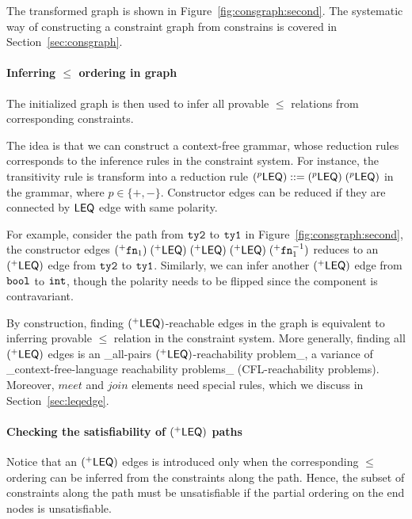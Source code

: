 The transformed graph is shown in Figure~\ref{fig:consgraph:second}. The
systematic way of constructing a constraint graph from constrains is covered in
Section~\ref{sec:consgraph}.

\paragraph{Inferring $\leq$ ordering in graph}

The initialized graph is then used to infer all provable $\leq$
relations from corresponding constraints.

The idea is that we can construct a context-free grammar, whose reduction
rules corresponds to the inference rules in the constraint system. For
instance, the transitivity rule is transform into a reduction rule
$(^{p}\mathsf{LEQ}) ::= (^{p}\mathsf{LEQ})\; (^{p}\mathsf{LEQ})$ in
the grammar, where $p\in \{+,-\}$. Constructor edges can be reduced
if they are connected by $\mathsf{LEQ}$ edge with same polarity.

For example, consider the path from $\mathtt{ty2}$ to $\mathtt{ty1}$ in
Figure~\ref{fig:consgraph:second}, the constructor edges
$(^{+}\mathtt{fn}_1)\; (^{+}\mathsf{LEQ})\; (^{+}\mathsf{LEQ})\;
(^{+}\mathsf{LEQ})\; (^{+}\mathtt{fn}_1^{-1})$ reduces to an
$(^{+}\mathsf{LEQ})$ edge from $\mathtt{ty2}$ to $\mathtt{ty1}$.
Similarly, we can infer another $(^{+}\mathsf{LEQ})$ edge from
$\mathtt{bool}$ to $\mathtt{int}$, though the polarity needs to be flipped
since the component is contravariant.

By construction, finding $(^{+}\mathsf{LEQ})$-reachable edges in the
graph is equivalent to inferring provable $\leq$ relation in the
constraint system. More generally, finding all $(^{+}\mathsf{LEQ})$
edges is an _all-pairs $(^{+}\mathsf{LEQ})$-reachability problem_, a variance
of _context-free-language reachability problems_ (CFL-reachability
problems). Moreover, $meet$ and $join$ elements need special rules,
which we discuss in Section~\ref{sec:leqedge}.

\paragraph{Checking the satisfiability of $(^{+}\mathsf{LEQ})$ paths}

Notice that an $(^{+}\mathsf{LEQ})$ edges is introduced only when the
corresponding $\leq$ ordering can be inferred from the constraints
along the path. Hence, the subset of constraints along the path must
be unsatisfiable if the partial ordering on the end nodes is
unsatisfiable.

